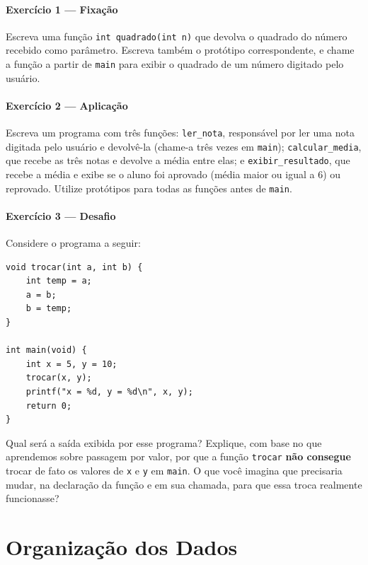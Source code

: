 \documentclass[12pt,a4paper,oneside]{extreport}
\begin{document}
\begin{exercicio}

\subsection*{Exercício 1 --- Fixação}
Escreva uma função \texttt{int quadrado(int n)} que devolva o quadrado do número recebido como parâmetro. Escreva também o protótipo correspondente, e chame a função a partir de \texttt{main} para exibir o quadrado de um número digitado pelo usuário.

\subsection*{Exercício 2 --- Aplicação}
Escreva um programa com três funções: \texttt{ler\_nota}, responsável por ler uma nota digitada pelo usuário e devolvê-la (chame-a três vezes em \texttt{main}); \texttt{calcular\_media}, que recebe as três notas e devolve a média entre elas; e \texttt{exibir\_resultado}, que recebe a média e exibe se o aluno foi aprovado (média maior ou igual a 6) ou reprovado. Utilize protótipos para todas as funções antes de \texttt{main}.

\subsection*{Exercício 3 --- Desafio}
Considere o programa a seguir:

\begin{lstlisting}
void trocar(int a, int b) {
    int temp = a;
    a = b;
    b = temp;
}

int main(void) {
    int x = 5, y = 10;
    trocar(x, y);
    printf("x = %d, y = %d\n", x, y);
    return 0;
}
\end{lstlisting}

Qual será a saída exibida por esse programa? Explique, com base no que aprendemos sobre passagem por valor, por que a função \texttt{trocar} \textbf{não consegue} trocar de fato os valores de \texttt{x} e \texttt{y} em \texttt{main}. O que você imagina que precisaria mudar, na declaração da função e em sua chamada, para que essa troca realmente funcionasse?

\end{exercicio}



\part{Organização dos Dados}
\end{document}
